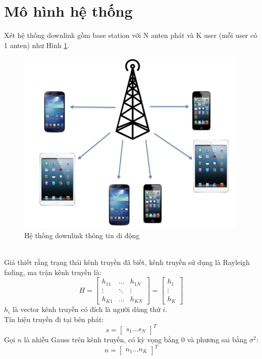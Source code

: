 \documentclass[conference]{IEEEtran}
\begin{document}
	\section{Mô hình hệ thống}
	Xét hệ thống downlink gồm base station với N anten phát và K user (mỗi user có  1 anten) như Hình \ref{Downlink}. 
	\begin{figure}[h]
		\includegraphics[width=\linewidth]{Figures/DL.png}
		\caption{Hệ thống downlink thông tin di động \cite{art2}}
		\label{Downlink}
	\end{figure}	
	\\Giả thiết rằng trạng thái kênh truyền đã biết, kênh truyền sử dụng là Rayleigh fading, ma trận kênh truyền là:
	\[H = 
	\begin{bmatrix}
	h_{11} & \dots & h_{1N}\\
	\vdots & \ddots & \vdots\\
	h_{K1} & \dots & h_{KN}
	\end{bmatrix}
	= 
	\begin{bmatrix}
	h_1\\
	\vdots\\
	h_K
	\end{bmatrix}
	\]	
	$h_i$ là vector kênh truyền có đích là người dùng thứ $i$.
	\\Tín hiệu truyền đi tại bên phát:
	\[
	s = 
	\begin{bmatrix}
	s_1 \dots s_N
	\end{bmatrix}^T
	\]
	Gọi $n$ là nhiễu Gauss trên kênh truyền, có kỳ vọng bằng $0$ và phương sai bằng $\sigma^2$:
	\[
	n = 
	\begin{bmatrix}
	n_1 \dots n_K
	\end{bmatrix}^T
	\]
\end{document}
